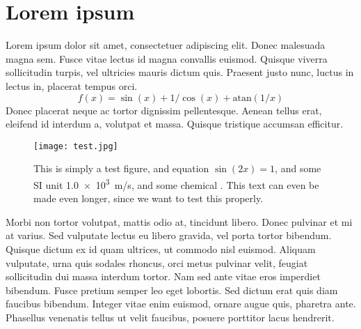 %

\section{Lorem ipsum}\label{sec:test2}
Lorem ipsum dolor sit amet, consectetuer adipiscing elit.
Donec malesuada magna sem.
Fusce vitae lectus id magna convallis euismod.
Quisque viverra sollicitudin turpis, vel ultricies mauris dictum quis.
Praesent justo nunc, luctus in lectus in, placerat tempus orci.
\begin{equation}
  f(x) = \sin(x) + 1/\cos(x) + \mathrm{atan}(1/x)
\end{equation}
Donec placerat neque ac tortor dignissim pellentesque.
Aenean tellus erat, eleifend id interdum a, volutpat et massa.
Quisque tristique accumsan efficitur.

\begin{figure}[h!]
  \centering
  \texttt{[image: test.jpg]}
  \caption{This is simply a test figure, and equation $\sin(2x)=1$, and some SI unit \SI{1.0e3}{m/s}, and some chemical . This text can even be made even longer, since we want to test this properly.}
  \label{fig:test}
\end{figure}


Morbi non tortor volutpat, mattis odio at, tincidunt libero.
Donec pulvinar et mi at varius.
Sed vulputate lectus eu libero gravida, vel porta tortor bibendum.
Quisque dictum ex id quam ultrices, ut commodo nisl euismod.
Aliquam vulputate, urna quis sodales rhoncus, orci metus pulvinar velit, feugiat sollicitudin dui massa interdum tortor.
Nam sed ante vitae eros imperdiet bibendum.
Fusce pretium semper leo eget lobortis.
Sed dictum erat quis diam faucibus bibendum.
Integer vitae enim euismod, ornare augue quis, pharetra ante.
Phasellus venenatis tellus ut velit faucibus, posuere porttitor lacus hendrerit.

